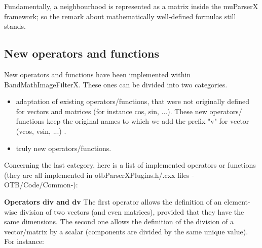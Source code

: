 Fundamentally, a neighbourhood is represented as a matrix inside the 
muParserX framework; so the remark about mathematically well-defined 
formulas still stands.

\begin{center}
\end{center}


\subsection{New operators and functions}\label{ssec:operators}

New operators and functions have been implemented within 
BandMathImageFilterX. These ones can be divided into two categories.

\begin{itemize}
\item adaptation of existing operators/functions, that were not originally defined for vectors and matrices (for instance cos, sin, ...). These new operators/ functions keep the original names to which we add the prefix "v" for vector (vcos, vsin, ...) .
\item truly new operators/functions.
\end{itemize}


Concerning the last category, here is a list of implemented 
operators or functions (they are all implemented in 
otbParserXPlugins.h/.cxx files -OTB/Code/Common-):

\textbf{Operators div and dv} \newline
The first operator allows the definition of an element-wise division of two vectors (and even matrices), provided that they have the same dimensions.
The second one allows the definition of the division of a vector/matrix by a scalar (components are divided by the same unique value). For instance: 

